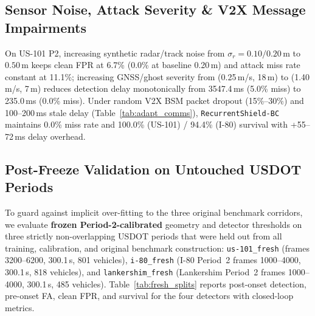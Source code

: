 \documentclass[journal]{IEEEtran}
\begin{document}
\subsection{Sensor Noise, Attack Severity \& V2X Message Impairments}
On US-101 P2, increasing synthetic radar/track noise from $\sigma_r=0.10/0.20\,\text{m}$ to $0.50\,\text{m}$ keeps clean FPR at 6.7\% (0.0\% at baseline 0.20\,m) and attack miss rate constant at 11.1\%; increasing GNSS/ghost severity from (0.25\,m/s, 18\,m) to (1.40\,m/s, 7\,m) reduces detection delay monotonically from 3547.4\,ms (5.0\% miss) to 235.0\,ms (0.0\% miss). Under random V2X BSM packet dropout (15\%--30\%) and 100--200\,ms stale delay (Table~\ref{tab:adapt_comms}), \texttt{RecurrentShield-BC} maintains 0.0\% miss rate and 100.0\% (US-101) / 94.4\% (I-80) survival with +55--72\,ms delay overhead.

\begin{table}[t]
\centering
\caption{Disjoint Adaptation Contamination ($N=25$) \& V2X Message Impairment}
\label{tab:adapt_comms}
\scriptsize
\setlength{\tabcolsep}{1.5pt}
\end{table}

\subsection{Post-Freeze Validation on Untouched USDOT Periods}
\label{sec:fresh}
To guard against implicit over-fitting to the three original benchmark corridors, we evaluate \textbf{frozen Period-2-calibrated} geometry and detector thresholds on three strictly non-overlapping USDOT periods that were held out from all training, calibration, and original benchmark construction: \texttt{us-101\_fresh} (frames 3200--6200, 300.1\,s, 801 vehicles), \texttt{i-80\_fresh} (I-80 Period~2 frames 1000--4000, 300.1\,s, 818 vehicles), and \texttt{lankershim\_fresh} (Lankershim Period~2 frames 1000--4000, 300.1\,s, 485 vehicles). Table~\ref{tab:fresh_splits} reports post-onset detection, pre-onset FA, clean FPR, and survival for the four detectors with closed-loop metrics.
\end{document}

